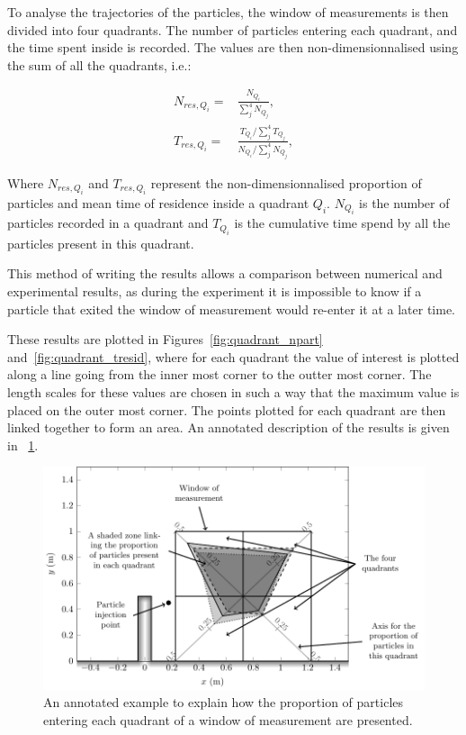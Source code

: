 To analyse the trajectories of the particles, the window of measurements is then
divided into four quadrants.
The number of particles entering each quadrant, and the time spent inside is
recorded.
The values are then non-dimensionnalised using the sum of all the quadrants, i.e.:

\begin{subequations}
\begin{align}
N_{res,Q_i}=&\frac{N_{Q_i}}{\sum_j^4{N_{Q_j}}},
\\
T_{res,Q_i}=&\frac{T_{Q_i}/\sum_j^4{T_{Q_j}}}{N_{Q_i}/\sum_j^4{N_{Q_j}}},
\end{align}
\end{subequations}

Where $N_{res,Q_i}$ and $T_{res,Q_i}$ represent the non-dimensionnalised
proportion of particles and mean time of residence inside a quadrant
$Q_i$. $N_{Q_i}$ is the number of particles recorded in a quadrant and $T_{Q_i}$
is the cumulative time spend by all the particles present in this quadrant.

This method of writing the results allows a comparison between numerical and
experimental results, as during the experiment it is impossible to know if a
particle that exited the window of measurement would re-enter it at a later time.

These results are plotted in Figures~\ref{fig:quadrant_npart}
and~\ref{fig:quadrant_tresid}, where for each quadrant the value of interest is
plotted along a line going from the inner most corner to the outter most corner.
The length scales for these values are chosen in such a way that the maximum
value is placed on the outer most corner.
The points plotted for each quadrant are then linked together to form an area.
An annotated description of the results is given in
\figurename~\ref{fig:expe_canal_annotated_example}.

\begin{figure}[H]
\begin{center}
  \includegraphics[]{./img/CanalAlgAnnotatedFigure}
\end{center}
\caption
{An annotated example to explain how the proportion of particles entering each quadrant of a window of measurement are presented.}
\label{fig:expe_canal_annotated_example}
\end{figure}

